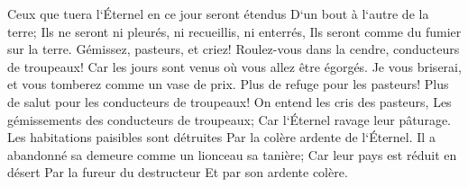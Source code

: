 \verse Ceux que tuera l`Éternel en ce jour seront étendus D`un bout à l`autre de la terre; Ils ne seront ni pleurés, ni recueillis, ni enterrés, Ils seront comme du fumier sur la terre. 
\verse Gémissez, pasteurs, et criez! Roulez-vous dans la cendre, conducteurs de troupeaux! Car les jours sont venus où vous allez être égorgés. Je vous briserai, et vous tomberez comme un vase de prix. 
\verse Plus de refuge pour les pasteurs! Plus de salut pour les conducteurs de troupeaux! 
\verse On entend les cris des pasteurs, Les gémissements des conducteurs de troupeaux; Car l`Éternel ravage leur pâturage. 
\verse Les habitations paisibles sont détruites Par la colère ardente de l`Éternel. 
\verse Il a abandonné sa demeure comme un lionceau sa tanière; Car leur pays est réduit en désert Par la fureur du destructeur Et par son ardente colère. 

